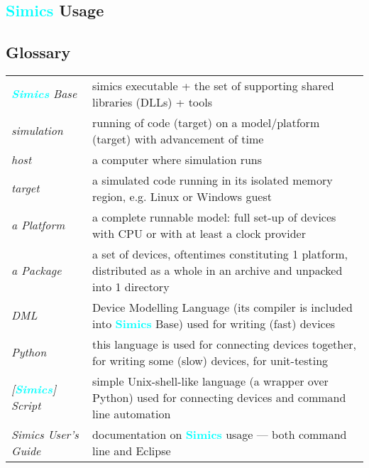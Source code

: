 \documentclass[8pt]{extarticle}
\newcommand{\cod}[1]{\colorbox{green!15}{#1}}
\newcommand{\Simics}{\textcolor{cyan}{\textbf{Simics}}}
\newlength{\MyLen}
\begin{document}
\setlength\emergencystretch{\hsize}


\begin{multicols*}{3}

\section{\Simics{} Usage}

\subsection{Glossary}
    \begin{tabular}{p{\the\MyLen}p{\linewidth-\the\MyLen-0.8cm}}
        \textit{\Simics{} Base} & \cod{simics} executable + the set of
        supporting shared libraries (DLLs) + tools
        \\
        \textit{simulation}  & running of code (target) on
        a model/platform (target) with advancement of time
        \\
        \textit{host}        & a computer where simulation runs
        \\
        \textit{target}      & a simulated
        code running in its isolated memory region, e.g. Linux or
        Windows guest
        \\
        \textit{a Platform}  & a complete runnable model:
        full set-up of devices
        with CPU or with at least a clock provider
        \\
        \textit{a Package}   & a set of devices, oftentimes constituting
        1 platform, distributed as a whole in an archive and unpacked
        into 1 directory
        \\
        \textit{DML}         & Device Modelling Language (its compiler 
        is included into \Simics{} Base) used for writing (fast) devices
        \\
        \textit{Python}      & this language is used for connecting 
        devices together, for writing some (slow) devices, for 
        unit-testing
        \\
        \textit{[\Simics] Script} & simple Unix-shell-like language (a wrapper
        over Python) used for connecting devices and command line 
        automation
        \\
        \textit{Simics User’s Guide} & documentation on \Simics{}
        usage — both command line and Eclipse
    \end{tabular}


\end{multicols*}
\end{document}
